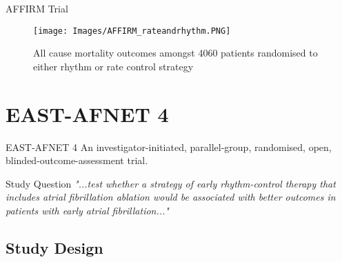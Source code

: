\documentclass[UKenglish]{beamer}
\begin{document}
\begin{frame}{AFFIRM Trial}
    \begin{figure}
        \caption{All cause mortality outcomes amongst 4060 patients randomised to either rhythm or rate control strategy}
        \texttt{[image: Images/AFFIRM\_rateandrhythm.PNG]}
    \end{figure}
    
\end{frame}


\section{EAST-AFNET 4}

\begin{frame}{EAST-AFNET 4}
    An investigator-initiated, parallel-group, randomised, open, blinded-outcome-assessment trial.
    
    \begin{alertblock}{Study Question}
        \textit{"...test whether a strategy of early rhythm-control therapy that includes atrial fibrillation ablation would be associated with better outcomes in patients with early atrial fibrillation..."}
    \end{alertblock}
\end{frame}
    

\subsection{Study Design}
\end{document}
